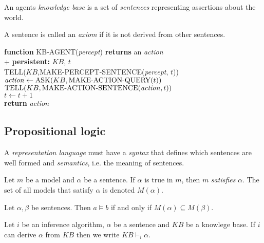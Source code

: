 \documentclass{article}
\begin{document}
\begin{definition}
    An agents \emph{knowledge base} is a set of \emph{sentences} representing assertions
    about the world.
\end{definition}

\begin{definition}
    A sentence is called an \emph{axiom} if it is not derived from other sentences.
\end{definition}

\begin{pseudo}
    \textbf{function} KB-AGENT(\emph{percept}) \textbf{returns} an \emph{action} \\+
        \textbf{persistent:} $KB$, $t$\\
        TELL($KB$,MAKE-PERCEPT-SENTENCE(\emph{percept}, $t$))\\
        $\text{\emph{action}}\leftarrow\text{ASK}(KB,\text{MAKE-ACTION-QUERY}(t))$\\
        $\text{TELL}(KB, \text{MAKE-ACTION-SENTENCE}(\text{\emph{action}},t))$\\
        $t\leftarrow t+1$\\
        \textbf{return} \emph{action}
\end{pseudo}

\subsection{Propositional logic}

\begin{definition}
    A \emph{representation language} must have a \emph{syntax} that defines which
    sentences are well formed and \emph{semantics}, i.e. the meaning of sentences.
\end{definition}

\begin{definition}
    Let $m$ be a model and $\alpha$ be a sentence. If $\alpha$ is true in $m$, then
    $m$ \emph{satisfies} $\alpha$. The set of all models that satisfy $\alpha$ is
    denoted $M(\alpha)$.
\end{definition}

\begin{definition}
    Let $\alpha,\beta$ be sentences. Then $a\vDash b$ if and only if $M(\alpha)\subseteq M(\beta)$.
\end{definition}

\begin{definition}
    Let $i$ be an inference algorithm, $\alpha$ be a sentence and $KB$ be a knowlege base.
    If $i$ can derive $\alpha$ from $KB$ then we write $KB\vdash_i \alpha$.
\end{definition}
\end{document}
